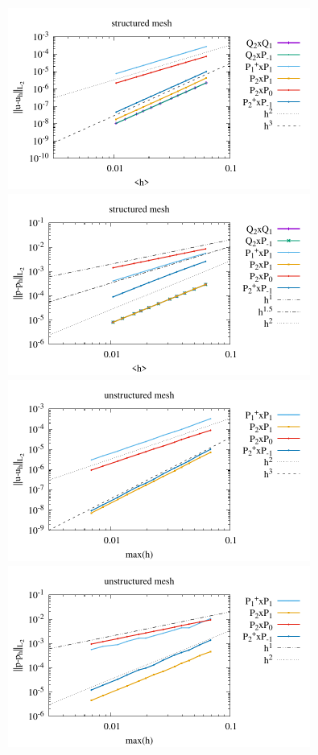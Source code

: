 \begin{center}
\includegraphics[width=8cm]{python_codes/fieldstone_120/paperresults/dh_structured_errorsV.pdf}
\includegraphics[width=8cm]{python_codes/fieldstone_120/paperresults/dh_structured_errorsP.pdf}\\
\includegraphics[width=8cm]{python_codes/fieldstone_120/paperresults/dh_unstructured_errorsV.pdf}
\includegraphics[width=8cm]{python_codes/fieldstone_120/paperresults/dh_unstructured_errorsP.pdf}
\end{center}

